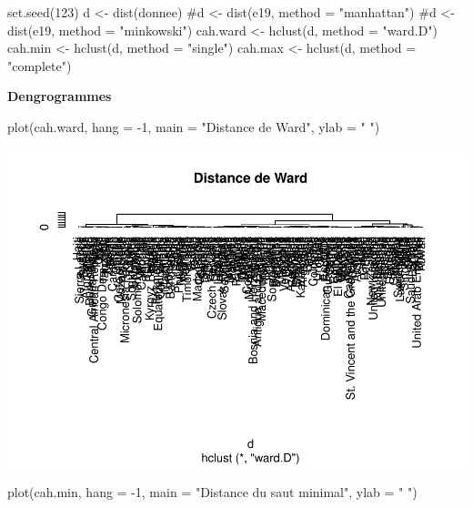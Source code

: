 \documentclass[
]{article}
\newenvironment{Shaded}{}{}
\newcommand{\AttributeTok}[1]{#1}
\newcommand{\CommentTok}[1]{\textcolor[rgb]{0.00,0.50,0.00}{#1}}
\newcommand{\DecValTok}[1]{#1}
\newcommand{\FunctionTok}[1]{#1}
\newcommand{\NormalTok}[1]{#1}
\newcommand{\OtherTok}[1]{\textcolor[rgb]{1.00,0.25,0.00}{#1}}
\newcommand{\SpecialCharTok}[1]{\textcolor[rgb]{0.00,0.50,0.50}{#1}}
\newcommand{\StringTok}[1]{\textcolor[rgb]{0.00,0.50,0.50}{#1}}
\begin{document}
\begin{Shaded}
\begin{Highlighting}[]
\FunctionTok{set.seed}\NormalTok{(}\DecValTok{123}\NormalTok{)}
\NormalTok{d }\OtherTok{\textless{}{-}} \FunctionTok{dist}\NormalTok{(donnee)}
\CommentTok{\#d \textless{}{-} dist(e19, method = "manhattan")}
\CommentTok{\#d \textless{}{-} dist(e19, method = "minkowski")}
\NormalTok{cah.ward }\OtherTok{\textless{}{-}} \FunctionTok{hclust}\NormalTok{(d, }\AttributeTok{method =} \StringTok{"ward.D"}\NormalTok{)}
\NormalTok{cah.min }\OtherTok{\textless{}{-}} \FunctionTok{hclust}\NormalTok{(d, }\AttributeTok{method =} \StringTok{"single"}\NormalTok{)}
\NormalTok{cah.max }\OtherTok{\textless{}{-}} \FunctionTok{hclust}\NormalTok{(d, }\AttributeTok{method =} \StringTok{"complete"}\NormalTok{)}
\end{Highlighting}
\end{Shaded}

\textbf{Dengrogrammes}

\begin{Shaded}
\begin{Highlighting}[]
\FunctionTok{plot}\NormalTok{(cah.ward, }\AttributeTok{hang =} \SpecialCharTok{{-}}\DecValTok{1}\NormalTok{, }\AttributeTok{main =} \StringTok{"Distance de Ward"}\NormalTok{, }\AttributeTok{ylab =} \StringTok{" "}\NormalTok{)}
\end{Highlighting}
\end{Shaded}

\includegraphics{Projet_files/figure-latex/unnamed-chunk-12-1.pdf}

\begin{Shaded}
\begin{Highlighting}[]
\FunctionTok{plot}\NormalTok{(cah.min, }\AttributeTok{hang =} \SpecialCharTok{{-}}\DecValTok{1}\NormalTok{, }\AttributeTok{main =} \StringTok{"Distance du saut minimal"}\NormalTok{, }\AttributeTok{ylab =} \StringTok{" "}\NormalTok{)}
\end{Highlighting}
\end{Shaded}
\end{document}
